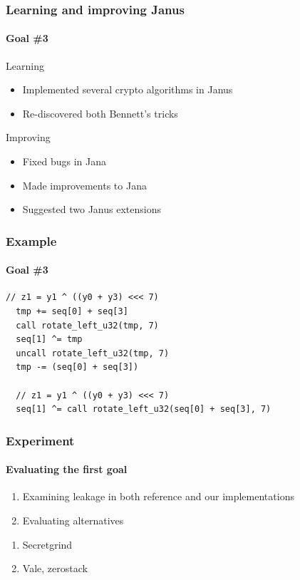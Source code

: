 \documentclass{beamer}
\begin{document}
\addtocounter{page}{1}
\begin{frame}
\addtocounter{page}{-1}
\frametitle{Learning and improving Janus}
\framesubtitle{\hspace{5mm}Goal \#3} 


\begin{block}{Learning}
\begin{itemize}
\item Implemented several crypto algorithms in Janus
\item Re-discovered both Bennett's tricks
\end{itemize}
\end{block}

\begin{block}{Improving}
\begin{itemize}
\item Fixed bugs in Jana
\item Made improvements to Jana
\item Suggested two Janus extensions
\end{itemize}
\end{block}

\end{frame}



\addtocounter{page}{1}
\begin{frame}[fragile]
\addtocounter{page}{-1}
\frametitle{Example}
\framesubtitle{\hspace{5mm}Goal \#3} 

\begin{lstlisting}[language=Janus]
  // z1 = y1 ^ ((y0 + y3) <<< 7)
  tmp += seq[0] + seq[3]
  call rotate_left_u32(tmp, 7)
  seq[1] ^= tmp
  uncall rotate_left_u32(tmp, 7)
  tmp -= (seq[0] + seq[3])
  
  // z1 = y1 ^ ((y0 + y3) <<< 7)
  seq[1] ^= call rotate_left_u32(seq[0] + seq[3], 7)
\end{lstlisting}

\end{frame}




\addtocounter{page}{1}
\begin{frame}
\addtocounter{page}{-1}
\frametitle{Experiment}
\framesubtitle{\hspace{5mm}Evaluating the first goal} 

\begin{enumerate}
\item Examining leakage in both reference and our implementations
\item Evaluating alternatives
\end{enumerate}

\pause
\begin{enumerate}
\item Secretgrind
\item Vale, zerostack
\end{enumerate}


\end{frame}
\end{document}
